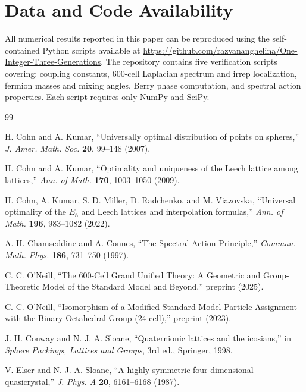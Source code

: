 \documentclass[12pt,a4paper]{article}
\theoremstyle{definition}
\begin{document}
\section*{Data and Code Availability}

All numerical results reported in this paper can be reproduced using the self-contained Python scripts available at \url{https://github.com/razvananghelina/One-Integer-Three-Generations}. The repository contains five verification scripts covering: coupling constants, 600-cell Laplacian spectrum and irrep localization, fermion masses and mixing angles, Berry phase computation, and spectral action properties. Each script requires only NumPy and SciPy.

\begin{thebibliography}{99}

H. Cohn and A. Kumar, ``Universally optimal distribution of points on spheres,'' \textit{J. Amer. Math. Soc.} \textbf{20}, 99--148 (2007).

H. Cohn and A. Kumar, ``Optimality and uniqueness of the Leech lattice among lattices,'' \textit{Ann. of Math.} \textbf{170}, 1003--1050 (2009).

H. Cohn, A. Kumar, S. D. Miller, D. Radchenko, and M. Viazovska, ``Universal optimality of the $E_8$ and Leech lattices and interpolation formulas,'' \textit{Ann. of Math.} \textbf{196}, 983--1082 (2022).

A. H. Chamseddine and A. Connes, ``The Spectral Action Principle,'' \textit{Commun. Math. Phys.} \textbf{186}, 731--750 (1997).

C. C. O'Neill, ``The 600-Cell Grand Unified Theory: A Geometric and Group-Theoretic Model of the Standard Model and Beyond,'' preprint (2025).

C. C. O'Neill, ``Isomorphism of a Modified Standard Model Particle Assignment with the Binary Octahedral Group (24-cell),'' preprint (2023).

J. H. Conway and N. J. A. Sloane, ``Quaternionic lattices and the icosians,'' in \textit{Sphere Packings, Lattices and Groups}, 3rd ed., Springer, 1998.

V. Elser and N. J. A. Sloane, ``A highly symmetric four-dimensional quasicrystal,'' \textit{J. Phys. A} \textbf{20}, 6161--6168 (1987).


\end{thebibliography}
\end{document}
